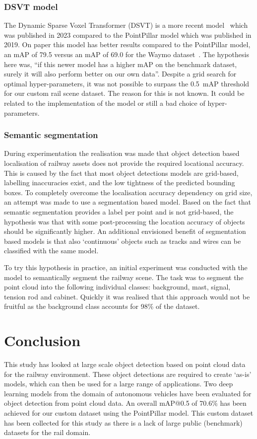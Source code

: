 \subsubsection{DSVT model}
The Dynamic Sparse Voxel Transformer (DSVT) is a more recent model~\cite{dsvt} which was published in 2023 compared to the PointPillar model which was published in 2019. On paper this model has better results compared to the PointPillar model, an mAP of 79.5 versus an mAP of 69.0 for the Waymo dataset~\cite{waymo}. The hypothesis here was, ``if this newer model has a higher mAP on the benchmark dataset, surely it will also perform better on our own data''. Despite a grid search for optimal hyper-parameters, it was not possible to surpass the 0.5~mAP threshold for our custom rail scene dataset. The reason for this is not known. It could be related to the implementation of the model or still a bad choice of hyper-parameters.

\subsubsection{Semantic segmentation}
During experimentation the realisation was made that object detection based localisation of railway assets does not provide the required locational accuracy. This is caused by the fact that most object detections models are grid-based, labelling inaccuracies exist, and the low tightness of the predicted bounding boxes. To completely overcome the localisation accuracy dependency on grid size, an attempt was made to use a segmentation based model. Based on the fact that semantic segmentation provides a label per point and is not grid-based, the hypothesis was that with some post-processing the location accuracy of objects should be significantly higher. An additional envisioned benefit of segmentation based models is that also `continuous' objects such as tracks and wires can be classified with the same model.

To try this hypothesis in practice, an initial experiment was conducted with the \pnpp{} model to semantically segment the railway scene. The task was to segment the point cloud into the following individual classes: background, mast, signal, tension rod and cabinet. Quickly it was realised that this approach would not be fruitful as the background class accounts for 98\% of the dataset.

\section{Conclusion}
This study has looked at large scale object detection based on point cloud data for the railway environment. These object detections are required to create `as-is' models, which can then be used for a large range of applications. Two deep learning models from the domain of autonomous vehicles have been evaluated for object detection from point cloud data. An overall mAP@0.5 of 70.6\% has been achieved for our custom dataset using the PointPillar model. This custom dataset has been collected for this study as there is a lack of large public (benchmark) datasets for the rail domain.

